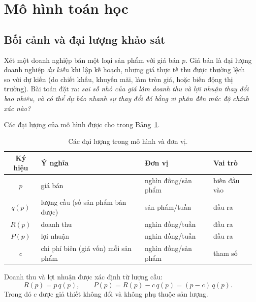 \section{Mô hình toán học}\label{sec:mohinh}

\subsection{Bối cảnh và đại lượng khảo sát}
Xét một doanh nghiệp bán một loại sản phẩm với giá bán $p$. Giá bán là đại lượng
doanh nghiệp \emph{dự kiến} khi lập kế hoạch, nhưng giá thực tế thu được thường lệch
so với dự kiến (do chiết khấu, khuyến mãi, làm tròn giá, hoặc biến động thị trường).
Bài toán đặt ra: \emph{sai số nhỏ của giá làm doanh thu và lợi nhuận thay đổi bao
nhiêu, và có thể dự báo nhanh sự thay đổi đó bằng vi phân đến mức độ chính xác nào?}

Các đại lượng của mô hình được cho trong Bảng~\ref{tab:var}.

\begin{table}[h]
\centering
\caption{Các đại lượng trong mô hình và đơn vị.}\label{tab:var}
\begin{tabular}{@{}clll@{}}
\toprule
Ký hiệu & Ý nghĩa & Đơn vị & Vai trò \\
\midrule
$p$ & giá bán & nghìn đồng/sản phẩm & biến đầu vào \\
$q(p)$ & lượng cầu (số sản phẩm bán được) & sản phẩm/tuần & đầu ra \\
$R(p)$ & doanh thu & nghìn đồng/tuần & đầu ra \\
$P(p)$ & lợi nhuận & nghìn đồng/tuần & đầu ra \\
$c$ & chi phí biên (giá vốn) mỗi sản phẩm & nghìn đồng/sản phẩm & tham số \\
\bottomrule
\end{tabular}
\end{table}

Doanh thu và lợi nhuận được xác định từ lượng cầu:
\begin{equation}
R(p) = p\,q(p), \qquad P(p) = R(p) - c\,q(p) = (p-c)\,q(p).
\end{equation}
Trong đó $c$ được giả thiết không đổi và không phụ thuộc sản lượng.

